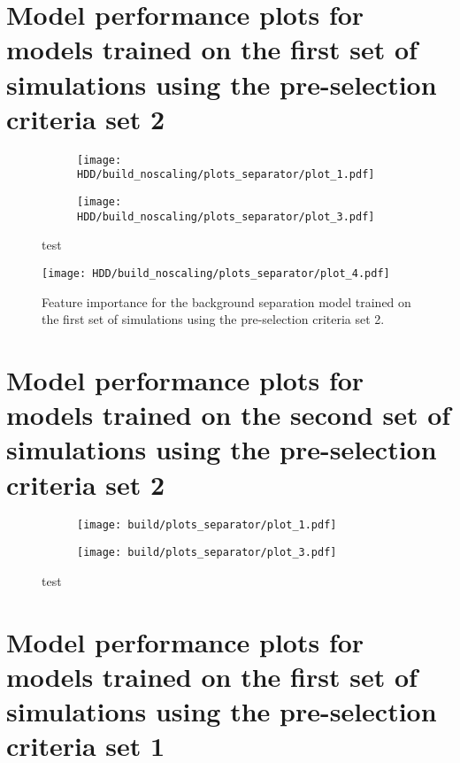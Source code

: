 \section{Model performance plots for models trained on the first set of simulations using the pre-selection criteria set 2}
\begin{figure}
    \centering
    \begin{subfigure}{0.7\textwidth}
        \centering
        \texttt{[image: HDD/build\_noscaling/plots\_separator/plot\_1.pdf]}
        \label{fig:separator_oldMC_150_1}
    \end{subfigure}
    \hfill
    \begin{subfigure}{0.7\textwidth}
        \centering
        \texttt{[image: HDD/build\_noscaling/plots\_separator/plot\_3.pdf]}
        \label{fig:separator_oldMC_150_2}
    \end{subfigure}
    \caption{test}
    \label{fig:separator_oldMC_150}
\end{figure}
\begin{figure}
    \centering
    \texttt{[image: HDD/build\_noscaling/plots\_separator/plot\_4.pdf]}
    \caption{Feature importance for the background separation model trained on the first set of simulations using the pre-selection criteria set 2.}
    \label{fig:separator_oldMC_150_feature}
\end{figure}


\section{Model performance plots for models trained on the second set of simulations using the pre-selection criteria set 2}
\begin{figure}
    \centering
    \begin{subfigure}{0.7\textwidth}
        \centering
        \texttt{[image: build/plots\_separator/plot\_1.pdf]}
        \label{fig:separator_newMC_150_1}
    \end{subfigure}
    \hfill
    \begin{subfigure}{0.7\textwidth}
        \centering
        \texttt{[image: build/plots\_separator/plot\_3.pdf]}
        \label{fig:separator_newMC_150_2}
    \end{subfigure}
    \caption{test}
    \label{fig:separator_newMC_150}
\end{figure}


\section{Model performance plots for models trained on the first set of simulations using the pre-selection criteria set 1}
